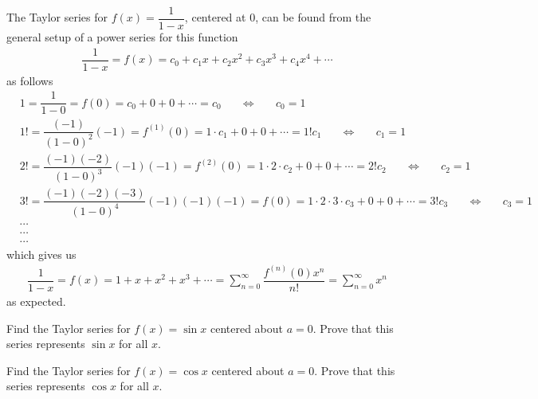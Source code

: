 \begin{example}
The Taylor series for $f(x) = \dfrac{1}{1-x}$, centered at $0$, can be found from the general setup of a power series for this function
\begin{align*}
    \dfrac{1}{1-x} = f(x) = c_{0} + c_{1}x + c_{2}x^{2} + c_{3}x^{3} + c_{4}x^{4} + \cdots
\end{align*}
as follows
\begin{align*}
    &1 = \dfrac{1}{1-0} = f(0) = c_{0} + 0 + 0 + \cdots = c_{0} \hspace{20pt} \Longleftrightarrow \hspace{20pt} c_{0} = 1\\[2ex]
    &1! = \dfrac{(-1)}{(1-0)^{2}}(-1) = f^{(1)}(0) = 1 \cdot c_{1} + 0 + 0 + \cdots = 1!c_{1} \hspace{20pt} \Longleftrightarrow \hspace{20pt} c_{1} = 1\\[2ex]
    &2! = \dfrac{(-1)(-2)}{(1-0)^{3}}(-1)(-1) = f^{(2)}(0) = 1 \cdot 2 \cdot c_{2} + 0 + 0 + \cdots = 2!c_{2} \hspace{20pt} \Longleftrightarrow \hspace{20pt} c_{2} = 1\\[2ex]
    &3! = \dfrac{(-1)(-2)(-3)}{(1-0)^{4}}(-1)(-1)(-1) = f(0) = 1 \cdot 2 \cdot 3 \cdot c_{3} + 0 + 0 + \cdots = 3!c_{3} \hspace{20pt} \Longleftrightarrow \hspace{20pt} c_{3} = 1\\[1ex]
    &\cdots\\[1ex]
    &\cdots\\[1ex]
    &\cdots
\end{align*}
which gives us
\begin{align*}
    \dfrac{1}{1-x} = f(x) = 1 + x + x^{2} + x^{3} + \cdots = \sum_{n=0}^{\infty} \dfrac{f^{(n)}(0)x^{n}}{n!} = \sum_{n=0}^{\infty} x^{n}
\end{align*}
as expected.
\end{example}

\begin{exercise}
Find the Taylor series for $f(x) = \sin x$ centered about $a = 0$. Prove that this series represents $\sin x$ for all $x$.
\end{exercise}

\begin{exercise}
Find the Taylor series for $f(x) = \cos x$ centered about $a = 0$. Prove that this series represents $\cos x$ for all $x$.
\end{exercise}

